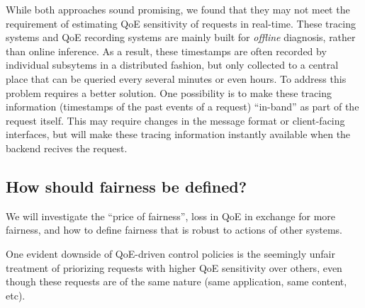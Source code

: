 While both approaches sound promising, we found that they may not meet the requirement of estimating QoE sensitivity of requests in real-time. 
These tracing systems and QoE recording systems are mainly built for {\em offline} diagnosis, rather than online inference. As a result, these timestamps are often recorded by individual subsytems in a distributed fashion, but only collected to a central place that can be queried every several minutes or even hours. 
To address this problem requires a better solution. 
One possibility is to make these tracing information (\eg timestamps of the past events of a request) ``in-band'' as part of the request itself. This may require changes in the message format or client-facing interfaces, but will make these tracing information instantly available when the backend recives the request.

\subsection{How should fairness be defined?}
\begin{task}
We will investigate the ``price of fairness'', \ie loss in QoE in exchange for more fairness, and how to define fairness that is robust to actions of other systems.
\end{task}

One evident downside of QoE-driven control policies is the seemingly unfair treatment of priorizing requests with higher QoE sensitivity over others, even though these requests are of the same nature (same application, same content, etc).

